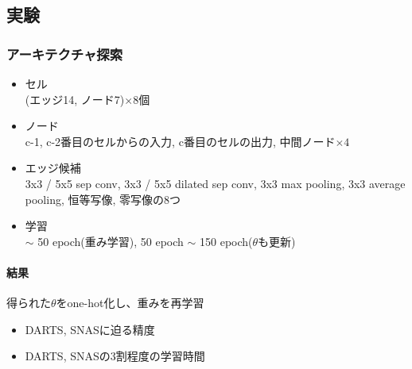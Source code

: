 \documentclass[twocolumn]{jarticle}     %
\begin{document}
\subsection{実験}
%

\subsubsection{アーキテクチャ探索}
\begin{itemize}
  \item セル\\
        (エッジ14, ノード7)$\times 8$個
  \item ノード\\
        c-1, c-2番目のセルからの入力, c番目のセルの出力, 中間ノード$\times 4$
  \item エッジ候補\\
        3x3 / 5x5 sep conv, 3x3 / 5x5 dilated sep conv, 3x3 max pooling, 3x3 average pooling, 恒等写像, 零写像の8つ%
  \item 学習\\
        $\sim$ 50 epoch(重み学習), 50 epoch $\sim$ 150 epoch($\theta$も更新)
\end{itemize}

\paragraph{結果}
得られた$\theta$をone-hot化し、重みを再学習
\begin{itemize}
  \item DARTS, SNASに迫る精度
  \item DARTS, SNASの3割程度の学習時間
\end{itemize}
\end{document}
